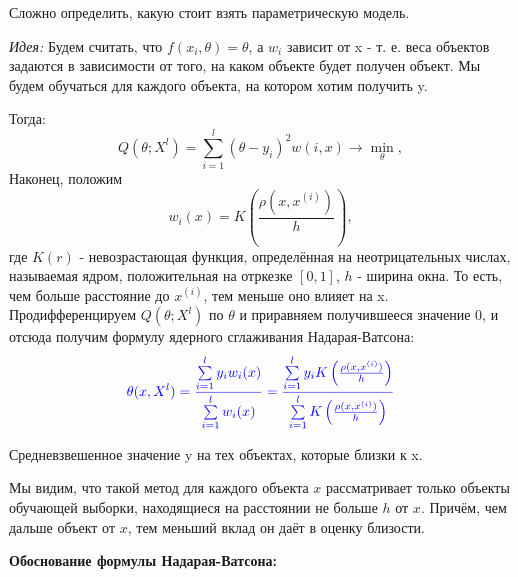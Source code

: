 Сложно определить, какую стоит взять параметрическую модель.

\textit{Идея:}
Будем считать, что $f(x_i, \theta)=\theta$,  а $w_i$ зависит от x - т. е. веса объектов задаются в зависимости от того, на каком объекте будет получен объект.
Мы будем обучаться для каждого объекта, на котором хотим получить y. 

Тогда:
\begin{equation*}
    \displaystyle Q(\theta; X^l) =  \sum\limits_{i=1}^l(\theta-y_i)^2w(i,x) \longrightarrow \min_\theta, 
\end{equation*}
Наконец, положим
\begin{equation*}
    \displaystyle w_i(x) = K\left(\frac{\rho(x, x^{(i)})}{h}\right),
\end{equation*}
где $K(r)$ - невозрастающая функция, определённая на неотрицательных числах, называемая ядром, положительная на отркезке $[0,1]$, $h$ - ширина окна. То есть, чем больше расстояние до $x^{(i)}$, тем меньше оно влияет на x.
\\ Продифференцируем $Q(\theta; X^l)$ по $\theta$ и приравняем получившееся значение 0, и отсюда получим формулу ядерного сглаживания Надарая-Ватсона: 
\begin{equation*}
   \textcolor{blue} {\theta(x, X^l)= \frac{\sum\limits_{i=1}^ly_iw_i(x)}{\sum\limits_{i=1}^lw_i(x)}= \frac{\sum\limits_{i=1}^ly_iK\left(\frac{\rho(x, x^{(i)})}{h}\right)}{\sum\limits_{i=1}^lK\left(\frac{\rho(x, x^{(i)})}{h}\right)}}
\end{equation*}

Средневзвешенное значение y на тех объектах, которые близки к x.

Мы видим, что такой метод для каждого объекта $x$ рассматривает только объекты обучающей выборки, находящиеся на расстоянии не больше $h$ от $x$. Причём, чем дальше объект от $x$, тем  меньший вклад он даёт в оценку близости.



\textbf{Обоснование формулы Надарая-Ватсона:}

